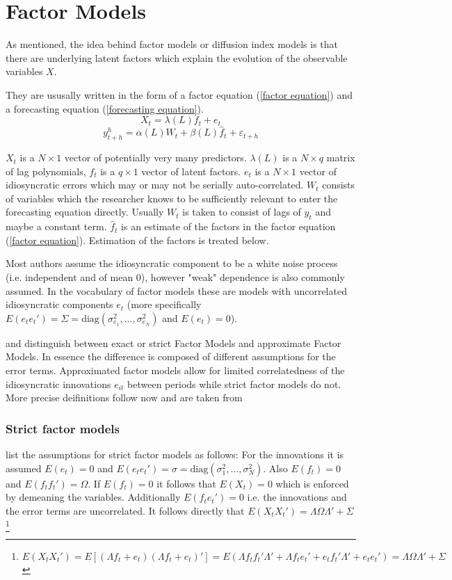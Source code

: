 \documentclass[11pt]{article}
\begin{document}
\section{Factor Models}
As mentioned, the idea behind factor models or diffusion index models is that there are underlying latent factors which explain the evolution of the observable variables $X$. 

They are ususally written in the form of a factor equation (\ref{factor equation}) and a forecasting equation (\ref{forecasting equation}). 
\begin{equation}
	\label{factor equation}
	X_t = \lambda(L) f_t + e_t
\end{equation}
\begin{equation}
	\label{forecasting equation}
	y^h_{t+h} = \alpha(L) W_t + \beta(L) \hat f_t + \varepsilon_{t+h}
\end{equation}
	
$X_t$ is a $N \times 1$ vector of potentially very many predictors. $\lambda(L)$ is a $N \times q$ matrix of lag polynomials, $f_t$ is a $q \times 1$ vector of latent factors. $e_t$ is a $N \times 1$ vector of idiosyncratic errors which may or may not be serially auto-correlated. $W_t$ consists of variables which the researcher knows to be sufficiently relevant to enter the forecasting equation directly. Usually $W_t$ is taken to consist of lags of $y_t$ and maybe a constant term. $\hat f_t$ is an estimate of the factors in the factor equation (\ref{factor equation}). Estimation of the factors is treated below.

Most authors assume the idiosyncratic component to be a white noise process (i.e. independent and of mean 0), however "weak" dependence is also commonly assumed. In the vocabulary of factor models these are models with uncorrelated idiosyncratic components $e_t$ (more specifically $E(e_t e_t') = \Sigma = \text{diag}(\sigma_{e_1}^2, ..., \sigma_{e_N}^2)$ and $E(e_t) = 0$).

\citet{geweke1977dynamic} and \citet{sargent1977business} distinguish between exact or strict Factor Models and approximate Factor Models. In essence the difference is composed of different assumptions for the error terms. Approximated factor models allow for limited correlatedness of the idiosyncratic innovations $e_{it}$ between periods while strict factor models do not. More precise deifinitions follow now and are taken from \citet{breitung2006dynamic}
\subsubsection*{Strict factor models}
\citet{breitung2006dynamic} list the assumptions for strict factor models as follows: For the innovations it is assumed $E(e_t) = 0$ and $E(e_te_t') = \sigma = \text{diag}(\sigma_1^2, ..., \sigma_N^2)$. Also $E(f_t) = 0$ and $E(f_tf_t') = \Omega$. If $E(f_t) = 0$ it follows that $E(X_t) = 0$ which is enforced by demeaning the variables. Additionally $E(f_t e_t') = 0$ i.e. the innovations and the error terms are uncorrelated. It follows directly that $E(X_tX_t') = \Lambda \Omega \Lambda' + \Sigma$\footnote{$E(X_tX_t') = E[(\Lambda f_t +e_t) (\Lambda f_t + e_t)'] = E(\Lambda f_t f_t' \Lambda' + \Lambda f_t e_t' + e_t f_t' \Lambda' + e_t e_t') = \Lambda \Omega \Lambda' + \Sigma$}
\end{document}
